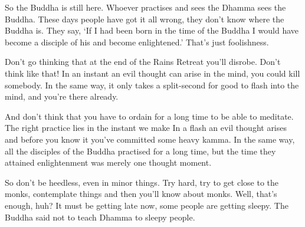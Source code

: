 So the Buddha is still here. Whoever practises and sees the Dhamma sees the Buddha. These days people have got it all wrong, they don't know where the Buddha is. They say, `If I had been born in the time of the Buddha I would have become a disciple of his and become enlightened.' That's just foolishness.

Don't go thinking that at the end of the Rains Retreat you'll disrobe. Don't think like that! In an instant an evil thought can arise in the mind, you could kill somebody. In the same way, it only takes a split-second for good to flash into the mind, and you're there already.

And don't think that you have to ordain for a long time to be able to meditate. The right practice lies in the instant we make  In a flash an evil thought arises and before you know it you've committed some heavy kamma. In the same way, all the disciples of the Buddha practised for a long time, but the time they attained enlightenment was merely one thought moment.

So don't be heedless, even in minor things. Try hard, try to get close to the monks, contemplate things and then you'll know about monks. Well, that's enough, huh? It must be getting late now, some people are getting sleepy. The Buddha said not to teach Dhamma to sleepy people.

